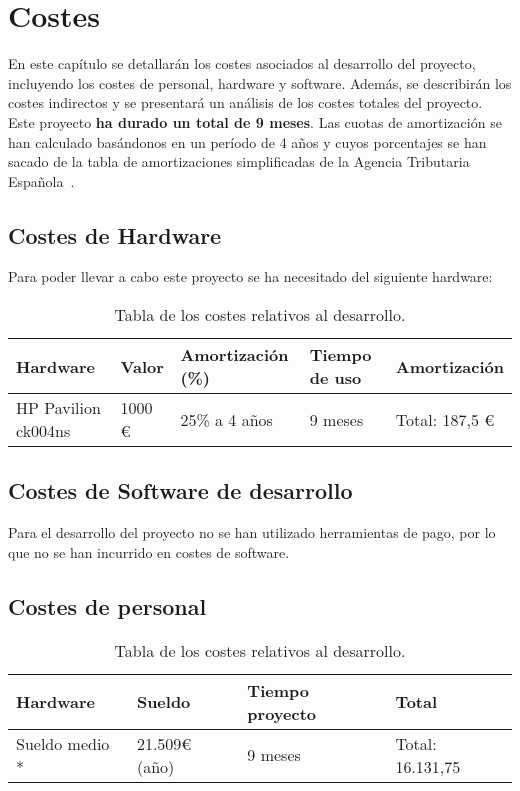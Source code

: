 \chapter{Costes}

En este capítulo se detallarán los costes asociados al desarrollo del proyecto, incluyendo los costes de personal, hardware y software. Además, se describirán los costes indirectos y se presentará un análisis de los costes totales del proyecto. Este proyecto \textbf{ha durado un total de 9 meses}. Las cuotas de amortización se han calculado basándonos en un período de 4 años y cuyos porcentajes se han sacado de la tabla de amortizaciones simplificadas de la Agencia Tributaria Española~\cite{agencia2023manual}.

\section{Costes de Hardware}

Para poder llevar a cabo este proyecto se ha necesitado del siguiente hardware:

\begin{table}[H]
  \centering
  \begin{tabular}{|l|l|l|l|l|}
    \hline
    \textbf{Hardware}   & \textbf{Valor} & \textbf{Amortización (\%)} & \textbf{Tiempo de uso} & \textbf{Amortización} \\ \hline
    HP Pavilion ck004ns & 1000 €         & 25\% a 4 años              & 9 meses                & Total: 187,5 €        \\ \hline
  \end{tabular}
  \caption{Tabla de los costes relativos al desarrollo.}
  \label{table:1}
\end{table}

\section{Costes de Software de desarrollo}

Para el desarrollo del proyecto no se han utilizado herramientas de pago, por lo que no se han incurrido en costes de software.

\section{Costes de personal}

\begin{table}[H]
  \centering
  \begin{tabular}{|l|l|l|l|}
    \hline
    \textbf{Hardware} & \textbf{Sueldo} & \textbf{Tiempo proyecto} & \textbf{Total}   \\ \hline
    Sueldo medio *    & 21.509€ (año)   & 9 meses                  & Total: 16.131,75 \\ \hline
  \end{tabular}
  \caption{Tabla de los costes relativos al desarrollo.}
  \label{table:1}
\end{table}

